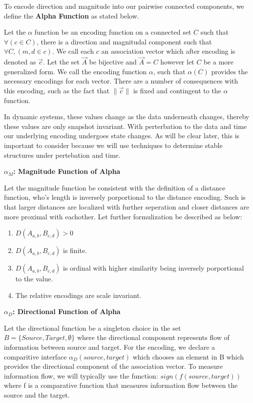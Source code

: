 To encode direction and magnitude into our pairwise connected components, we define the \textbf{Alpha Function} as stated below. 

\begin{definition} 
\end{definition}

Let the $\alpha$ function be an encoding function on a connected set $C$ such that $\forall(c \in C)$, there is a direction and magnitudal component such that $\forall C, (m,d \in c)$. We call each $c$ an association vector which after encoding is denoted as $\vec{c}$. Let the set $\vec{A}$ be bijective and $\vec{A} = C$ however let $C$ be a more generalized form. We call the encoding function $\alpha$, such that $\alpha(C)$ provides the necessary encodings for each vector. There are a number of consequences with this encoding, such as the fact that $\|\vec{c}\|$ is fixed and contingent to the $\alpha$ function.

In dynamic systems, these values change as the data underneath changes, thereby these values are only snapshot invariant. With perterbation to the data and time our underlying encoding undergoes state changes. As will be clear later, this is important to consider because we will use techniques to determine stable structures under pertebation and time.

\textbf{$\alpha_M$: Magnitude Function of Alpha}

Let the magnitude function be consistent with the definition of a distance function, who's length is inversely porportional to the distance encoding. Such is that larger distances are localized with further seperation and closer distances are more proximal with eachother. Let further formulization be described as below:

\begin{enumerate}
  \item $D(A_{a,b}, B_{c,d}) > 0$
  \item $D(A_{a,b}, B_{c,d})$ is finite.
  \item $D(A_{a,b}, B_{c,d})$ is ordinal with higher similarity being inversely porportional to the value.
  \item The relative encodings are scale invariant.  
\end{enumerate}  

\textbf{$\alpha_D$: Directional Function of Alpha}

Let the directional function be a singleton choice in the set $B = \{Source,Target,\emptyset\}$ where the directional component represents flow of information between source and target. For the encoding, we declare a comparitive interface $\alpha_{D}(source,target)$ which chooses an element in B which provides the directional component of the association vector. To measure information flow, we will typically use the function:  $sign(f(source,target))$ where f is a comparative function that measures information flow between the source and the target. 

